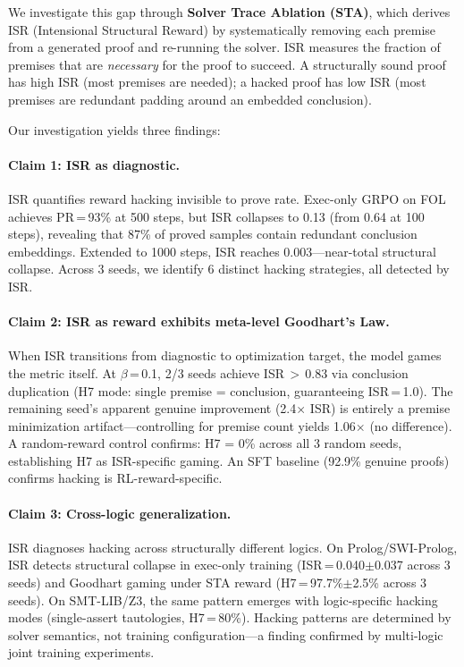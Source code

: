 \documentclass[11pt,a4paper]{article}
\begin{document}
We investigate this gap through \textbf{Solver Trace Ablation (STA)}, which derives ISR (Intensional Structural Reward) by systematically removing each premise from a generated proof and re-running the solver.
ISR measures the fraction of premises that are \emph{necessary} for the proof to succeed.
A structurally sound proof has high ISR (most premises are needed); a hacked proof has low ISR (most premises are redundant padding around an embedded conclusion).

Our investigation yields three findings:

\paragraph{Claim 1: ISR as diagnostic.}
ISR quantifies reward hacking invisible to prove rate.
Exec-only GRPO on FOL achieves PR\,=\,93\% at 500 steps, but ISR collapses to 0.13 (from 0.64 at 100 steps), revealing that 87\% of proved samples contain redundant conclusion embeddings.
Extended to 1000 steps, ISR reaches 0.003---near-total structural collapse.
Across 3 seeds, we identify 6 distinct hacking strategies, all detected by ISR.

\paragraph{Claim 2: ISR as reward exhibits meta-level Goodhart's Law.}
When ISR transitions from diagnostic to optimization target, the model games the metric itself.
At $\beta$\,=\,0.1, 2/3 seeds achieve ISR\,$>$\,0.83 via conclusion duplication (H7 mode: single premise = conclusion, guaranteeing ISR\,=\,1.0).
The remaining seed's apparent genuine improvement (2.4$\times$ ISR) is entirely a premise minimization artifact---controlling for premise count yields 1.06$\times$ (no difference).
A random-reward control confirms: H7 = 0\% across all 3 random seeds, establishing H7 as ISR-specific gaming.
An SFT baseline (92.9\% genuine proofs) confirms hacking is RL-reward-specific.

\paragraph{Claim 3: Cross-logic generalization.}
ISR diagnoses hacking across structurally different logics.
On Prolog/SWI-Prolog, ISR detects structural collapse in exec-only training (ISR\,=\,0.040$\pm$0.037 across 3 seeds) and Goodhart gaming under STA reward (H7\,=\,97.7\%$\pm$2.5\% across 3 seeds).
On SMT-LIB/Z3, the same pattern emerges with logic-specific hacking modes (single-assert tautologies, H7\,=\,80\%).
Hacking patterns are determined by solver semantics, not training configuration---a finding confirmed by multi-logic joint training experiments.
\end{document}
